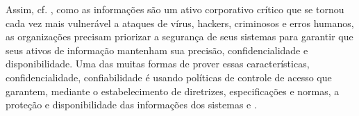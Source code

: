Assim, cf. , como as informações são um ativo corporativo crítico que se tornou cada vez mais vulnerável a ataques de vírus, hackers, criminosos e erros humanos, as organizações precisam priorizar a segurança de seus sistemas para garantir que seus ativos de informação mantenham sua precisão, confidencialidade e disponibilidade. Uma das muitas formas de prover essas características, confidencialidade, confiabilidade é usando políticas de controle de acesso que garantem, mediante o estabelecimento de diretrizes, especificações e normas, a proteção e disponibilidade das informações dos sistemas \cite{bellettini_role_2001} e \cite{ueda_tese_2012}.






